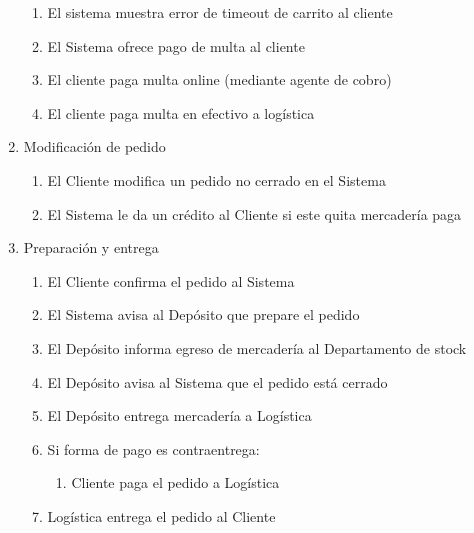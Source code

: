 \begin{enumerate}
\begin{enumerate}
    \item El sistema muestra error de timeout de carrito al cliente \label{itm:f-sistema-error-timeout-cliente}
    \item El Sistema ofrece pago de multa al cliente \label{itm:f-sistema-ofrece-multa-cliente}
    \item El cliente paga multa online (mediante agente de cobro) \label{itm:f-cliente-paga-multa-agentecobro}
    \item El cliente paga multa en efectivo a logística \label{itm:f-cliente-paga-multa-logistica}
  \end{enumerate}
  
\item Modificación de pedido
  \begin{enumerate}
    \item El Cliente modifica un pedido no cerrado en el Sistema \label{itm:f-cliente-modifica-pedido-sistema}
    \item El Sistema le da un crédito al Cliente si este quita mercadería paga \label{itm:f-sistema-da-credito-cliente}
  \end{enumerate}

\item Preparación y entrega
  \begin{enumerate}
    \item El Cliente confirma el pedido al Sistema \label{itm:f-cliente-confirma-pedido-sistema}
    \item El Sistema avisa al Depósito que prepare el pedido \label{itm:f-sistema-avisa-pedido-deposito}
    \item El Depósito informa egreso de mercadería al Departamento de stock \label{itm:f-sistema-egresa-mercaderia-dptostock}
    \item El Depósito avisa al Sistema que el pedido está cerrado \label{itm:f-deposito-cerro-pedido-sistema}
    \item El Depósito entrega mercadería a Logística \label{itm:f-deposito-entrega-mercaderia-logistica}
    \item Si forma de pago es contraentrega: 
    \begin{enumerate}
      \item Cliente paga el pedido a Logística \label{itm:f-cliente-paga-logistica}
    \end{enumerate}
    \item Logística entrega el pedido al Cliente \label{itm:f-logistica-entrega-cliente}
  \end{enumerate}


\end{enumerate}
